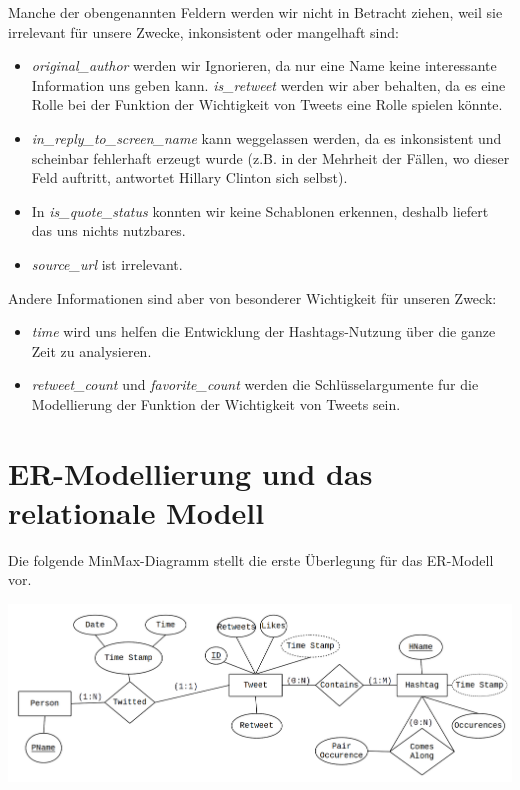 \documentclass[paper=a4, english, ngerman, romanian]{scrartcl}
\begin{document}
		Manche der obengenannten Feldern werden wir nicht in Betracht ziehen, weil sie irrelevant für unsere Zwecke, inkonsistent oder mangelhaft sind:
		
		\begin{itemize}
		\item \textit{original\_author} werden wir Ignorieren, da nur eine Name keine interessante Information uns geben kann. \textit{is\_retweet} werden wir aber behalten, da es eine Rolle bei der Funktion der Wichtigkeit von Tweets eine Rolle spielen könnte.
		\item \textit{in\_reply\_to\_screen\_name} kann weggelassen werden, da es inkonsistent und scheinbar fehlerhaft erzeugt wurde (z.B. in der Mehrheit der Fällen, wo dieser Feld auftritt, antwortet Hillary Clinton sich selbst).
		\item  In \textit{is\_quote\_status} konnten wir keine Schablonen erkennen, deshalb liefert das uns nichts nutzbares.
		\item \textit{source\_url} ist irrelevant.
		\end{itemize}
		
		Andere Informationen sind aber von besonderer Wichtigkeit für unseren Zweck:
		
		\begin{itemize}
		\item \textit{time} wird uns helfen die Entwicklung der Hashtags-Nutzung über die ganze Zeit zu analysieren. 
		\item \textit{retweet\_count} und \textit{favorite\_count} werden die Schlüsselargumente fur die Modellierung der Funktion der Wichtigkeit von Tweets sein.
		\end{itemize}
		

\section{ER-Modellierung und das relationale Modell}
	
	Die folgende MinMax-Diagramm stellt die erste Überlegung für das ER-Modell vor. 
	\begin{center}
	\includegraphics[scale=0.2]{MinMax_Diagram.png}
	\end{center}
\end{document}
